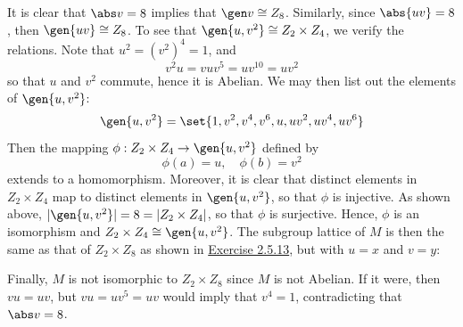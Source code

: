 \begin{sol}
    It is clear that $\abs v = 8$ implies that $\gen v \cong Z_8$. Similarly, since $\abs{uv} = 8$, then $\gen{uv} \cong Z_8$. To see that $\gen{u, v^2} \cong Z_2 \times Z_4$, we verify the relations. Note that $u^2 = (v^2)^4 = 1$, and
    \[v^2u = vuv^5 = uv^{10} = uv^2\]
    so that $u$ and $v^2$ commute, hence it is Abelian. We may then list out the elements of $\gen{u, v^2}$:
    \[\gen{u, v^2} = \set{1, v^2, v^4, v^6, u, uv^2, uv^4, uv^6}\]
    Then the mapping $\phi : Z_2 \times Z_4 \to \gen{u, v^2}$ defined by
    \[\phi(a) = u, \quad \phi(b) = v^2\]
    extends to a homomorphism. Moreover, it is clear that distinct elements in $Z_2 \times Z_4$ map to distinct elements in $\gen{u, v^2}$, so that $\phi$ is injective. As shown above, $|\gen{u, v^2}| = 8 = |Z_2 \times Z_4|$, so that $\phi$ is surjective. Hence, $\phi$ is an isomorphism and $Z_2 \times Z_4 \cong \gen{u, v^2}$. The subgroup lattice of $M$ is then the same as that of $Z_2 \times Z_8$ as shown in \hyperref[ex2.5.13]{Exercise 2.5.13}, but with $u = x$ and $v = y$:
    \begin{center}
    \end{center}
    Finally, $M$ is not isomorphic to $Z_2 \times Z_8$ since $M$ is not Abelian. If it were, then $vu = uv$, but $vu = uv^5 = uv$ would imply that $v^4 = 1$, contradicting that $\abs v = 8$.
\end{sol}


